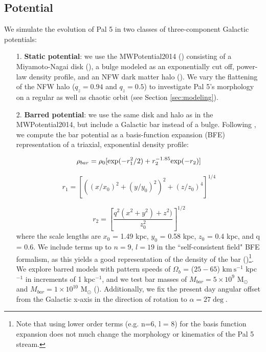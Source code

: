 \documentclass[twocolumn]{aastex62}
\newcommand{\msun}{\textrm{M}_\odot}
\newcommand{\kms}{\ensuremath{\textrm{km}~\textrm{s}^{-1}}}
\begin{document}
\subsection{Potential}
\label{sec:potential}
We simulate the evolution of Pal 5 in two classes of three-component Galactic potentials: 

\begin{itemize}
\item[1.] {\bf Static potential}: we use the {\small MWPotential2014} (\citealt{Bovy:2015}) consisting of a Miyamoto-Nagai disk (\citealt{Miyamoto:1975}), a bulge modeled as an exponentially cut off, power-law density profile, and an NFW dark matter halo (\citealt{Navarro:1996}).
We vary the flattening of the NFW halo ($q_z = 0.94$ and $q_z = 0.5$) to investigate Pal 5's morphology on a regular as well as chaotic orbit (see Section \ref{sec:modeling}). 

\item[2.] {\bf  Barred potential}: we use the same disk and halo as in the {\small MWPotential2014}, but include a Galactic bar instead of a bulge.
Following \citet{wang:2012}, we compute the bar potential as a basis-function expansion (BFE) representation of a triaxial, exponential density profile:

\begin{equation}
\rho_{bar} = \rho_0 [{\rm exp} (-r^2_1/2) + r_2^{-1.85} {\rm exp}(-r_2) ]
\end{equation}

\begin{equation}
r_1 = \left[\left((x/x_0)^2 + (y/y_0)^2\right)^2 +( z/z_0)^4\right]^{1/4}
\end{equation}

\begin{equation}
r_2 = \left[\frac{q^2(x^2 + y^2) + z^2)}{z_0^2}\right]^{1/2}
\end{equation}
where the scale lengths are $x_0$ = 1.49 kpc, $y_0$ = 0.58 kpc, $z_0$ = 0.4 kpc, and q = 0.6. We include terms up to $n=9$, $l=19$ in the ``self-consistent field" BFE formalism, as this yields a good representation of the density of the bar (\citealt{Banik:2019})\footnote{Note that using lower order terms (e.g. n=6, l = 8) for the basis function expansion does not much change the morphology or kinematics of the Pal 5 stream.}.
We explore barred models with pattern speeds of $\Omega_b$ = ($25 - 65$) $\kms$ kpc$^{-1}$ in increments of 1 kpc$^{-1}$, and  we test bar masses of $M_{bar} = 5 \times 10^{9}$ $\msun$ and $M_{bar} = 1 \times 10^{10}$ $\msun$ (\citealt{Portail:2017}).
Additionally, we fix the present day angular offset from the Galactic x-axis in the direction of rotation to $\alpha = 27\deg$.
\end{itemize}
\end{document}
